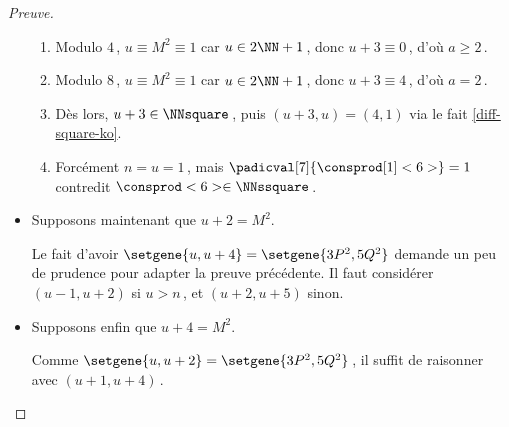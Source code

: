 \begin{proof}[Preuve]
\begin{itemize}
\begin{enumerate}
			\item Modulo $4$\,, $u \equiv M^2 \equiv 1$ car $u \in 2 \NN + 1$\,,
			donc $u + 3 \equiv 0$\,, d'où $a \geq 2$\,.

			\item Modulo $8$\,, $u \equiv M^2 \equiv 1$ car $u \in 2 \NN + 1$\,,
			donc $u + 3 \equiv 4$\,, d'où $a = 2$\,.

			\item Dès lors, $u + 3 \in \NNsquare$\,, puis $(u + 3, u) = (4, 1)$ via le fait \ref{diff-square-ko}.

			\item Forcément $n = u = 1$\,, mais $\padicval[7]{\consprod[1]<6>} = 1$ contredit $\consprod<6> \in \NNssquare$\,.
		\end{enumerate}


    	\item Supposons maintenant que $u + 2 = M^2$.

		\smallskip
		\noindent
		Le fait d'avoir $\setgene{u, u + 4} = \setgene{3P^2, 5Q^2}$ demande un peu de prudence pour adapter la preuve précédente. 
		Il faut considérer $(u - 1, u + 2)$ si $u > n$\,, et $(u + 2, u + 5)$ sinon.


    	\item Supposons enfin que $u + 4 = M^2$.

		\smallskip
		\noindent
		Comme $\setgene{u, u + 2} = \setgene{3P^2, 5Q^2}$\,, il suffit de raisonner avec $(u + 1, u + 4)$\,.
    \end{itemize}
\end{proof}

 
